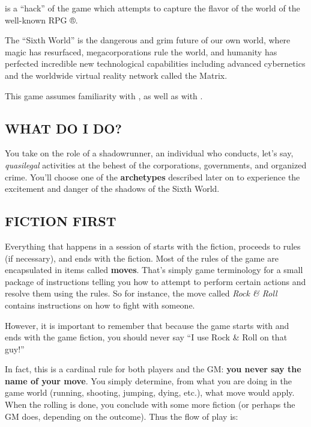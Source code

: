 \documentclass[oneside,10pt]{article}
\begin{document}
\begin{multicols}{2}

\SW{} is a “hack” of the game \DW{} which
attempts to capture the flavor of the world of the well-known
RPG \SR{}®.

The “Sixth World” is the dangerous and grim future of our
own world, where magic has resurfaced, megacorporations
rule the world, and humanity has perfected incredible new
technological capabilities including advanced cybernetics and
the worldwide virtual reality network called the
Matrix.

This game assumes familiarity with \SR{}, as well as
with \DW{}.


\subsection{WHAT DO I DO?}

You take on the role of a shadowrunner, an individual who
conducts, let’s say, \textit{quasilegal} activities at the behest of the
corporations, governments, and organized crime. You’ll
choose one of the \textbf{archetypes} described later on to experience the excitement and danger of the shadows of the Sixth
World.


\subsection{FICTION FIRST}

Everything that happens in a session of \SW{}  starts
with the fiction, proceeds to rules (if necessary), and ends
with the fiction. Most of the rules of the game are encapsulated in items called \textbf{moves}. That’s simply game terminology for
a small package of instructions telling you how to attempt to
perform certain actions and resolve them using the rules. So
for instance, the move called \textit{Rock \& Roll} contains instructions
on how to fight with someone.


However, it is important to remember that because the game
starts with and ends with the game fiction, you should never
say “I use Rock \& Roll on that guy!”


In fact, this is a cardinal rule for both players and the GM: \textbf{you
never say the name of your move}. You simply determine,
from what you are doing in the game world (running, shooting, jumping, dying, etc.), what move would apply. When
the rolling is done, you conclude with some more fiction (or
perhaps the GM does, depending on the outcome). Thus the
flow of play is:


\end{multicols}
\end{document}
